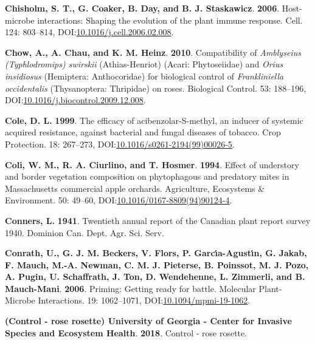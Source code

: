 \documentclass[12pt,final,CPage]{ufthesis}
\newlength{\cslhangindent}
\newenvironment{CSLReferences}[2] %
{%
	\setlength{\parindent}{0pt}
	\ifodd #1 \everypar{\setlength{\hangindent}{\cslhangindent}}\ignorespaces\fi
	\ifnum #2 > 0
	\setlength{\parskip}{#2\baselineskip}
	\fi
}%
{}
\begin{document}
{\begin{CSLReferences}{1}{0}
  \leavevmode{}%
  \textbf{Chisholm, S. T., G. Coaker, B. Day, and B. J. Staskawicz}. \textbf{2006}. Host-microbe interactions: Shaping the evolution of the plant immune response. Cell. 124: 803--814, DOI:\href{https://doi.org/10.1016/j.cell.2006.02.008}{10.1016/j.cell.2006.02.008}.

  \leavevmode{}%
  \textbf{Chow, A., A. Chau, and K. M. Heinz}. \textbf{2010}. Compatibility of {\emph{Amblyseius (Typhlodromips) swirskii}} ({Athias-Henriot}) ({Acari: Phytoseiidae}) and {\emph{Orius insidiosus}} ({Hemiptera}: {Anthocoridae}) for biological control of {\emph{Frankliniella occidentalis}} ({Thysanoptera:} {Thripidae}) on roses. Biological Control. 53: 188--196, DOI:\href{https://doi.org/10.1016/j.biocontrol.2009.12.008}{10.1016/j.biocontrol.2009.12.008}.

  \leavevmode{}%
  \textbf{Cole, D. L.} \textbf{1999}. The efficacy of acibenzolar-{S}-methyl, an inducer of systemic acquired resistance, against bacterial and fungal diseases of tobacco. Crop Protection. 18: 267--273, DOI:\href{https://doi.org/10.1016/s0261-2194(99)00026-5}{10.1016/s0261-2194(99)00026-5}.

  \leavevmode{}%
  \textbf{Coli, W. M., R. A. Ciurlino, and T. Hosmer}. \textbf{1994}. Effect of understory and border vegetation composition on phytophagous and predatory mites in {Massachusetts} commercial apple orchards. Agriculture, Ecosystems {\&} Environment. 50: 49--60, DOI:\href{https://doi.org/10.1016/0167-8809(94)90124-4}{10.1016/0167-8809(94)90124-4}.

  \leavevmode{}%
  \textbf{Conners, L.} \textbf{1941}. Twentieth annual report of the {Canadian} plant report survey 1940. Dominion Can. Dept. Agr. Sci. Serv.

  \leavevmode{}%
  \textbf{Conrath, U., G. J. M. Beckers, V. Flors, P. Garcı́a-Agustı́n, G. Jakab, F. Mauch, M.-A. Newman, C. M. J. Pieterse, B. Poinssot, M. J. Pozo, A. Pugin, U. Schaffrath, J. Ton, D. Wendehenne, L. Zimmerli, and B. Mauch-Mani}. \textbf{2006}. Priming: Getting ready for battle. Molecular Plant-Microbe Interactions{\textregistered}. 19: 1062--1071, DOI:\href{https://doi.org/10.1094/mpmi-19-1062}{10.1094/mpmi-19-1062}.

  \leavevmode{}%
  \textbf{(Control - rose rosette) University of Georgia - Center for Invasive Species and Ecosystem Health}. \textbf{2018}. Control - rose rosette.


\end{CSLReferences}}
\end{document}

